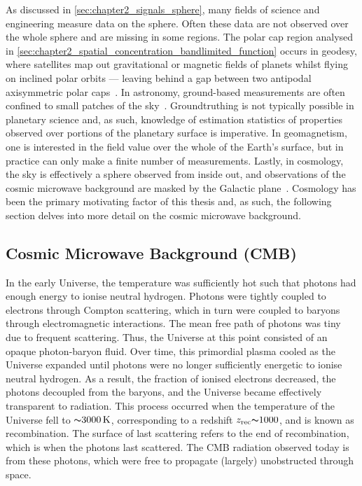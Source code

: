 As discussed in \cref{sec:chapter2_signals_sphere}, many fields of science and engineering measure data on the sphere.
Often these data are not observed over the whole sphere and are missing in some regions.
The polar cap region analysed in \cref{sec:chapter2_spatial_concentration_bandlimited_function} occurs in geodesy, where satellites map out gravitational or magnetic fields of planets whilst flying on inclined polar orbits --- leaving behind a gap between two antipodal axisymmetric polar caps~\cite{Simons2006a}.
In astronomy, ground-based measurements are often confined to small patches of the sky~\cite{Peebles1973,Tegmark1995}.
Groundtruthing is not typically possible in planetary science and, as such, knowledge of estimation statistics of properties observed over portions of the planetary surface is imperative.
In geomagnetism, one is interested in the field value over the whole of the Earth's surface, but in practice can only make a finite number of measurements.
Lastly, in cosmology, the sky is effectively a sphere observed from inside out, and observations of the cosmic microwave background are masked by the Galactic plane~\cite{Tegmark1996,Hinshaw2003}.
Cosmology has been the primary motivating factor of this thesis and, as such, the following section delves into more detail on the cosmic microwave background.

\subsection{Cosmic Microwave Background (CMB)}\label{sec:chapter2_cosmic_microwave_background}

In the early Universe, the temperature was sufficiently hot such that photons had enough energy to ionise neutral hydrogen.
Photons were tightly coupled to electrons through Compton scattering, which in turn were coupled to baryons through electromagnetic interactions.
The mean free path of photons was tiny due to frequent scattering.
Thus, the Universe at this point consisted of an opaque photon-baryon fluid.
Over time, this primordial plasma cooled as the Universe expanded until photons were no longer sufficiently energetic to ionise neutral hydrogen.
As a result, the fraction of ionised electrons decreased, the photons decoupled from the baryons, and the Universe became effectively transparent to radiation.
This process occurred when the temperature of the Universe fell to \({\thicksim}\SI{3000}{\kelvin}\), corresponding to a redshift \(z_{\text{rec}} {\thicksim}1000\), and is known as recombination.
The surface of last scattering refers to the end of recombination, which is when the photons last scattered.
The CMB radiation observed today is from these photons, which were free to propagate (largely) unobstructed through space.

